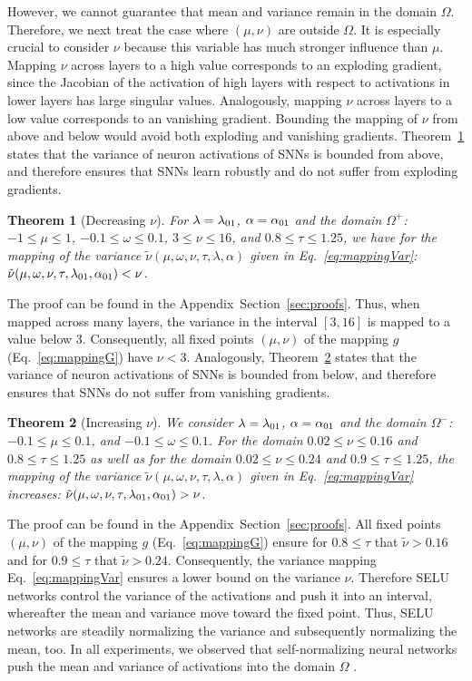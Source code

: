 \documentclass{article}
\newtheorem{theorem}{Theorem}
\newcommand\nunn{{\tilde \nu}}
\renewcommand{\leq}{\leqslant}
\begin{document}
However, we cannot guarantee that mean and variance remain in the domain $\Omega$.
Therefore, we next treat the case where $(\mu,\nu)$ are outside $\Omega$.
It is especially crucial to consider $\nu$ because this variable has much stronger 
influence than $\mu$. Mapping $\nu$ across layers to a high value corresponds to an 
exploding gradient, since the  Jacobian of the activation of high layers with respect to activations
in lower layers has large singular values. 
Analogously, mapping $\nu$ across layers to a low value corresponds to an 
vanishing gradient. Bounding the mapping of $\nu$ from above and below would avoid 
both exploding and vanishing gradients.
Theorem~\ref{th:varDecrease} states that the variance of neuron activations of SNNs
is bounded from above, and therefore ensures that SNNs learn robustly and do not  
suffer from exploding gradients.

\begin{theorem}[Decreasing $\nu$]
\label{th:varDecrease} 
For $\lambda=\lambda_{\rm 01}$, $\alpha=\alpha_{\rm 01}$
and the domain $\Omega^+$:
$-1 \leq \mu \leq 1$, 
$-0.1 \leq \omega \leq 0.1$,
$3 \leq \nu \leq 16$, and 
$0.8 \leq \tau \leq 1.25$, 
we have for the mapping of the variance
$\nunn(\mu,\omega,\nu,\tau,\lambda, \alpha )$  given in Eq.~\eqref{eq:mappingVar}:
$\nunn(\mu,\omega,\nu,\tau,\lambda_{\rm 01},\alpha_{\rm 01})  < \nu$.
\end{theorem}
The proof can be found in the Appendix~Section~\ref{sec:proofs}.
Thus, when mapped across many layers, the variance in the interval $[3,16]$ is mapped to a value below $3$. Consequently, all fixed
points $(\mu,\nu)$ of the mapping $g$ (Eq.~\eqref{eq:mappingG}) have $\nu<3$.
Analogously, Theorem~\ref{th:s2Increase} states that the variance of neuron activations of SNNs
is bounded from below, and therefore ensures that SNNs do not suffer from vanishing gradients.
\begin{theorem}[Increasing $\nu$]
\label{th:s2Increase} 
We consider $\lambda=\lambda_{\rm 01}$, $\alpha=\alpha_{\rm 01}$
and the domain $\Omega^-$: 
$-0.1 \leq \mu \leq 0.1$, and
$-0.1 \leq \omega \leq 0.1$.
For the domain 
$0.02 \leq \nu \leq 0.16$
and $0.8 \leq \tau \leq 1.25$ as well as for the domain
$0.02 \leq \nu \leq 0.24$
and $0.9 \leq \tau \leq 1.25$,
the mapping of the variance
$\nunn(\mu,\omega,\nu,\tau,\lambda,\alpha )$  given in Eq.~\eqref{eq:mappingVar} 
increases:
$\nunn(\mu,\omega,\nu,\tau,\lambda_{\rm 01},\alpha_{\rm 01})  >  \nu$.
\end{theorem}
The proof can be found in the Appendix~Section~\ref{sec:proofs}.
All fixed
points $(\mu,\nu)$ of the mapping $g$ (Eq.~\eqref{eq:mappingG}) ensure for $0.8 \leq \tau$ that
$\nunn>0.16$ 
and for $0.9 \leq \tau$ that $\nunn>0.24$.
Consequently, the variance mapping Eq.~\eqref{eq:mappingVar} ensures a lower bound on the variance $\nu$. 
Therefore SELU networks control the variance of the activations and
push it into an interval, whereafter the mean and variance move toward
the fixed point. 
Thus, SELU networks are steadily normalizing the variance and
subsequently normalizing the mean, too. 
In all experiments, we observed that 
self-normalizing neural networks push the mean and variance of activations into the domain $\Omega$ .
\end{document}
